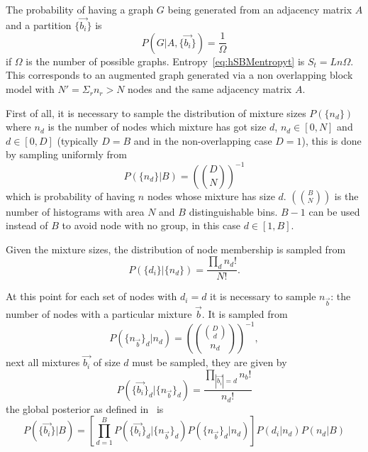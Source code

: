 The probability of having a graph $G$ being generated from an adjacency matrix $A$ and a partition $\{\vec{b_i}\}$ is \[P(G|A,\{\vec{b_i}\})=\frac{1}{\Omega}\]
if $\Omega$ is the number of possible graphs. Entropy~\ref{eq:hSBMentropyt} is $S_t=Ln\Omega$. This corresponds to an augmented graph generated via a
non overlapping block model with $N'=\Sigma_r n_r>N$ nodes and the same adjacency matrix $A$.

First of all, it is necessary to sample the distribution of mixture sizes $P(\{n_d\})$ where $n_d$ is the number of nodes which mixture has got size $d$, $n_d\in[0,N]$ and $d\in[0,D]$ (typically $D=B$ and in the non-overlapping case $D=1$), this is done by sampling uniformly from \[P(\{n_d\}|B)=\left(\binom{D}{N}\right)^{-1}\] which is probability of having $n$ nodes whose mixture has size $d$. $\left(\binom{B}{N}\right)$ is the number of histograms with area $N$ and $B$ distinguishable bins. $B-1$ can be used instead of $B$ to avoid node with no group, in this case $d\in[1,B]$.

Given the mixture sizes, the distribution of node membership is sampled from \[P(\{d_i\}|\{n_d\})=\frac{\prod_{d} n_d!}{N!}.\]

At this point for each set of nodes with $d_i=d$ it is necessary to sample $n_{\vec{b}}$: the number of nodes with a particular mixture $\vec{b}$. It is sampled from
\begin{equation}
  P(\{n_{\vec{b}}\}_d|n_d)=\left(\binom{\binom{D}{d}}{n_d}\right)^{-1},
\end{equation}
next all mixtures $\vec{b_i}$ of size $d$ must be sampled, they are given by
\begin{equation}
  P(\{\vec{b_i}\}_d|\{n_{\vec{b}}\}_d)=\frac{\prod_{|\vec{b_i}|=d} n_b!}{n_d!}
\end{equation}
the global posterior as defined in~\cite{peixoto2015model} is
\begin{equation}
  P(\{\vec{b_i}\}|B)=\left[\prod_{d=1}^B  P(\{\vec{b_i}\}_d|\{n_{\vec{b}}\}_d) P(\{n_{\vec{b}}\}_d|n_d)\right]P({d_i}|{n_d})P(n_d|B)
\end{equation}

